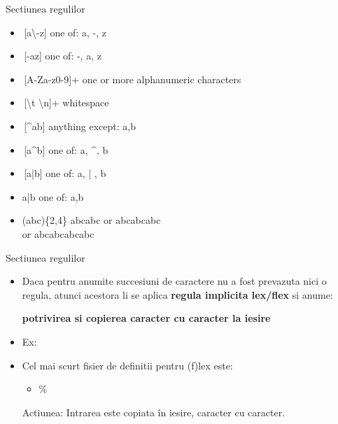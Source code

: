 \documentclass[pdf]{beamer}
\begin{document}
\begin{frame}{Sectiunea regulilor}
\begin{itemize}
\item
\,[a\textbackslash-z] \hspace{26mm} one of: a, -, z

\item
\,[-az] \hspace{28mm} one of: -, a, z

\item
\,[A-Za-z0-9]+ \hspace{14mm} one or more alphanumeric characters

\item
\,[\textbackslash t \textbackslash n]+ \hspace{22mm} whitespace

\item
\,[\^{}ab] \hspace{28mm} anything except: a,b

\item
\,[a\^{}b] \hspace{28mm} one of: a, \^{}, b

\item
\,[a|b] \hspace{30mm} one of: a, | , b

\item
a|b \hspace{32mm} one of: a,b

\item
(abc)\{2,4\} \hspace{17mm} abcabc or abcabcabc \\ 
\hspace{30mm} or abcabcabcabc

\end{itemize}
\end{frame}



\begin{frame}{Sectiunea regulilor}
\begin{itemize}
\item
Daca pentru anumite succesiuni de caractere nu a fost prevazuta nici o regula, atunci acestora li se aplica \textbf{regula implicita lex/flex} si anume: 

\textbf{potrivirea si copierea caracter cu caracter la iesire}

\item
Ex:
\item
Cel mai scurt fisier de definitii pentru (f)lex este:

\begin{itemize}
    \item 
    \%
\end{itemize}
Actiunea: Intrarea este copiata în iesire, caracter cu caracter.
\end{itemize}
\end{frame}
\end{document}
